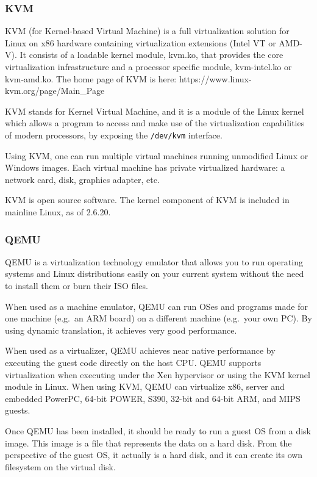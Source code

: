 \hypertarget{kvm}{%
\subsubsection{KVM}\label{kvm}}

KVM (for Kernel-based Virtual Machine) is a full virtualization solution
for Linux on x86 hardware containing virtualization extensions (Intel VT
or AMD-V). It consists of a loadable kernel module, kvm.ko, that
provides the core virtualization infrastructure and a processor specific
module, kvm-intel.ko or kvm-amd.ko. The home page of KVM is here:
https://www.linux-kvm.org/page/Main\_Page

KVM stands for Kernel Virtual Machine, and it is a module of the Linux
kernel which allows a program to access and make use of the
virtualization capabilities of modern processors, by exposing the
\texttt{/dev/kvm} interface.

Using KVM, one can run multiple virtual machines running unmodified
Linux or Windows images. Each virtual machine has private virtualized
hardware: a network card, disk, graphics adapter, etc.

KVM is open source software. The kernel component of KVM is included in
mainline Linux, as of 2.6.20.

\hypertarget{qemu}{%
\subsubsection{QEMU}\label{qemu}}

QEMU is a virtualization technology emulator that allows you to run
operating systems and Linux distributions easily on your current system
without the need to install them or burn their ISO files.

When used as a machine emulator, QEMU can run OSes and programs made for
one machine (e.g.~an ARM board) on a different machine (e.g.~your own
PC). By using dynamic translation, it achieves very good performance.

When used as a virtualizer, QEMU achieves near native performance by
executing the guest code directly on the host CPU. QEMU supports
virtualization when executing under the Xen hypervisor or using the KVM
kernel module in Linux. When using KVM, QEMU can virtualize x86, server
and embedded PowerPC, 64-bit POWER, S390, 32-bit and 64-bit ARM, and
MIPS guests.

Once QEMU has been installed, it should be ready to run a guest OS from
a disk image. This image is a file that represents the data on a hard
disk. From the perspective of the guest OS, it actually is a hard disk,
and it can create its own filesystem on the virtual disk.

